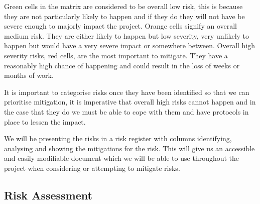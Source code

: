 Green cells in the matrix are considered to be overall low risk, this is because they are not particularly likely to happen and if they do they will not have be severe enough to majorly impact the project.
Orange cells signify an overall medium risk.
They are either likely to happen but low severity, very unlikely to happen but would have a very severe impact or somewhere between.
Overall high severity risks, red cells, are the most important to mitigate.
They have a reasonably high chance of happening and could result in the loss of weeks or months of work.

It is important to categorise risks once they have been identified so that we can prioritise mitigation, it is imperative that overall high risks cannot happen and in the case that they do we must be able to cope with them and have protocols in place to lessen the impact.

We will be presenting the risks in a risk register with columns identifying, analysing and showing the mitigations for the risk.
This will give us an accessible and easily modifiable document which we will be able to use throughout the project when considering or attempting to mitigate risks.

\newpage

\begin{landscape}
\section{Risk Assessment}

\end{landscape}